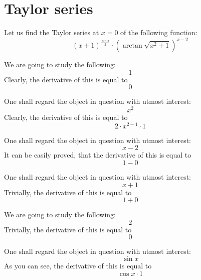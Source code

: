 \documentclass{article}
\begin{document}
\newpage
\section{Taylor series}
Let us find the Taylor series at $x = 0$ of the following function:
\begin{equation}
\left( x + 1 \right) ^{\frac{\sin x }{2 } } \cdot \left( \arctan \sqrt {x ^{2 } + 1 } \right) ^{x - 2 } 
\end{equation}

We are going to study the following:
\begin{equation}
1 
\end{equation}
Clearly, the derivative of this is equal to
\begin{equation}
0 
\end{equation}

One shall regard the object in question with utmost interest:
\begin{equation}
x ^{2 } 
\end{equation}
Clearly, the derivative of this is equal to
\begin{equation}
2 \cdot x ^{2 - 1 } \cdot 1 
\end{equation}

One shall regard the object in question with utmost interest:
\begin{equation}
x - 2 
\end{equation}
It can be easily proved, that the derivative of this is equal to
\begin{equation}
1 - 0 
\end{equation}

One shall regard the object in question with utmost interest:
\begin{equation}
x + 1 
\end{equation}
Trivially, the derivative of this is equal to
\begin{equation}
1 + 0 
\end{equation}

We are going to study the following:
\begin{equation}
2 
\end{equation}
Trivially, the derivative of this is equal to
\begin{equation}
0 
\end{equation}

One shall regard the object in question with utmost interest:
\begin{equation}
\sin x 
\end{equation}
As you can see, the derivative of this is equal to
\begin{equation}
\cos x \cdot 1 
\end{equation}
\end{document}
